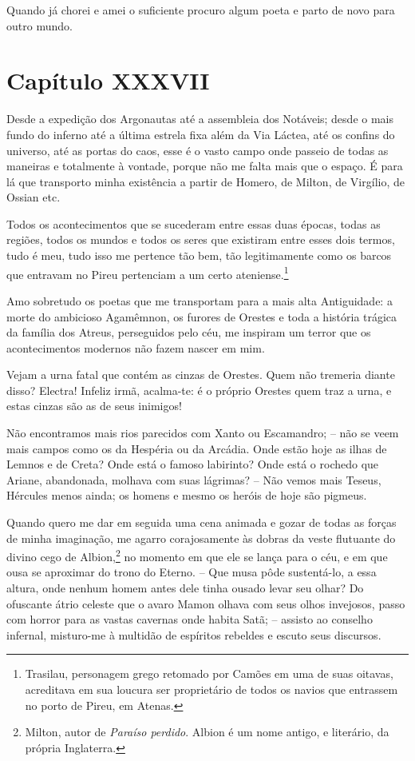 Quando já chorei e amei o suficiente procuro algum poeta e parto de
novo para outro mundo. 

\section*{Capítulo XXXVII}

 Desde a expedição dos Argonautas até a assembleia dos Notáveis; desde o
mais fundo do inferno até a última estrela fixa além da Via Láctea, até
os confins do universo, até as portas do caos, esse é o vasto campo
onde passeio de todas as maneiras  e totalmente à vontade, porque não
me falta mais que o espaço. É para lá que transporto minha existência a
partir de Homero, de Milton, de Virgílio, de Ossian etc.

 Todos os acontecimentos que se sucederam entre essas duas épocas, todas
as regiões, todos os mundos e todos os seres que existiram entre esses
dois termos, tudo é meu, tudo isso me pertence tão bem, tão
legitimamente como os barcos que entravam no Pireu pertenciam a um
certo ateniense.\footnote{ Trasilau, personagem grego retomado por
Camões em uma de suas oitavas, acreditava em sua loucura ser
proprietário de todos os navios que entrassem no porto de Pireu, em Atenas.} 

 Amo sobretudo os poetas que me transportam para a mais alta
Antiguidade: a morte do ambicioso Agamêmnon, os furores de Orestes e
toda a história trágica da família dos Atreus, perseguidos pelo céu, me
inspiram um terror que os acontecimentos modernos não fazem nascer em
mim.

 Vejam a urna fatal que contém as cinzas de Orestes. Quem não tremeria
diante disso? Electra! Infeliz irmã, acalma-te: é o próprio Orestes
quem traz a urna, e estas cinzas são as de seus inimigos!

 Não encontramos mais rios parecidos com Xanto ou Escamandro; -- não se
veem mais campos como os da Hespéria ou da Arcádia. Onde estão hoje as
ilhas de Lemnos e de Creta? Onde está o famoso labirinto? Onde está o
rochedo que Ariane, abandonada, molhava com suas lágrimas? -- Não
vemos mais Teseus, Hércules menos ainda; os homens e mesmo os heróis de
hoje são pigmeus.

 Quando quero me dar em seguida uma cena animada e gozar de todas as
forças de minha imaginação, me agarro corajosamente às dobras da veste
flutuante do divino cego de Albion,\footnote{ Milton, autor de
\textit{Paraíso perdido}. Albion é um nome antigo, e literário, da
própria Inglaterra.} no momento em que ele se lança para o céu, e
em que ousa se aproximar do trono do Eterno. -- Que musa pôde
sustentá-lo, a essa altura, onde nenhum homem antes dele tinha ousado
levar seu olhar? Do ofuscante átrio celeste que o avaro Mamon olhava
com seus olhos invejosos, passo com horror para as vastas cavernas onde
habita Satã; -- assisto ao conselho infernal, misturo-me à multidão de
espíritos rebeldes e escuto seus discursos.

